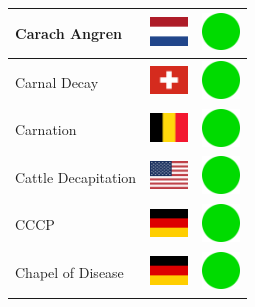 \documentclass[12pt, a4paper, twoside]{report}
\begin{document}
\begin{center}
\begin{longtable}{|p{5cm}|p{2cm}|p{2cm}|}
Carach Angren & \includegraphics[width=1cm]{4x3/nl} & \includegraphics[width=1cm]{likes/y} \\ \hline
Carnal Decay & \includegraphics[width=1cm]{4x3/ch} & \includegraphics[width=1cm]{likes/y} \\ \hline
Carnation & \includegraphics[width=1cm]{4x3/be} & \includegraphics[width=1cm]{likes/y} \\ \hline
Cattle Decapitation & \includegraphics[width=1cm]{4x3/us} & \includegraphics[width=1cm]{likes/y} \\ \hline
CCCP & \includegraphics[width=1cm]{4x3/de} & \includegraphics[width=1cm]{likes/y} \\ \hline
Chapel of Disease & \includegraphics[width=1cm]{4x3/de} & \includegraphics[width=1cm]{likes/y} \\ \hline

\end{longtable}
\end{center}
\end{document}
